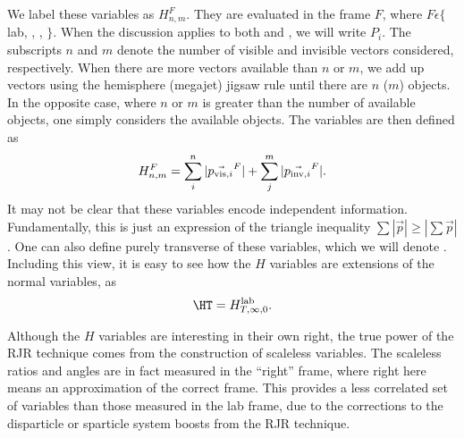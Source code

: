 We label these variables as $H_{n,m}^F$.
They are evaluated in the frame $F$, where $F \epsilon \{$lab, \PP, \Pa, \Pb$\}$.
When the discussion applies to both \Pa and \Pb, we will write $P_i$.
The subscripts $n$ and $m$ denote the number of visible and invisible vectors considered, respectively.
When there are more vectors available than $n$ or $m$, we add up vectors using the hemisphere (megajet) jigsaw rule until there are $n$ ($m$) objects\footnotemark.
In the opposite case, where $n$ or $m$ is greater than the number of available objects, one simply considers the available objects.
The  variables are then defined as
\begin{align}
H^{{F}}_{n,m} = \sum_i^n | \vec{p_{\text{vis},i}}^F | + \sum_j^m | \vec{p_{\text{inv},i}}^F |.
\end{align}
It may not be clear that these variables encode independent information.
Fundamentally, this is just an expression of the triangle inequality $\sum |\vec{p}| \geq |\sum \vec{p}|$.
One can also define purely transverse of these variables, which we will denote .
Including this view, it is easy to see how the $H$ variables are extensions of the normal \HT variables, as
\begin{align}
\HT = \HTFnm{\text{lab}}{\infty}{0}.
\end{align}

Although the $H$ variables are interesting in their own right, the true power of the RJR technique comes from the construction of scaleless variables.
The scaleless ratios and angles are in fact measured in the ``right'' frame, where right here means an approximation of the correct frame.
This provides a less correlated set of variables than those measured in the lab frame, due to the corrections to the disparticle or sparticle system boosts from the RJR technique.

